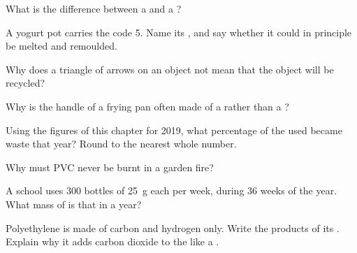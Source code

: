 \begin{exercise}[$\star$]\label{exo:g8:plastics:4}
What is the difference between a  and a ?
\end{exercise}

\begin{exercise}[$\star\star$]\label{exo:g8:plastics:5}
A yogurt pot carries the code 5. Name its , and say whether it
could in principle be melted and remoulded.
\end{exercise}

\begin{exercise}[$\star\star$]\label{exo:g8:plastics:6}
Why does a triangle of arrows on an object not mean that the object will
be recycled?
\end{exercise}

\begin{exercise}[$\star\star$]\label{exo:g8:plastics:7}
Why is the handle of a frying pan often made of a  rather than a
?
\end{exercise}

\begin{exercise}[$\star\star$]\label{exo:g8:plastics:8}
Using the figures of this chapter for 2019, what percentage of the
 used became waste that year? Round to the nearest whole number.
\end{exercise}

\begin{exercise}[$\star\star$]\label{exo:g8:plastics:9}
Why must PVC never be burnt in a garden fire?
\end{exercise}

\begin{exercise}[$\star\star$]\label{exo:g8:plastics:10}
A school uses 300 bottles of \qty{25}{g} each per week, during 36 weeks
of the year. What mass of  is that in a year?
\end{exercise}

\begin{exercise}[$\star\star\star$]\label{exo:g8:plastics:11}
Polyethylene is made of carbon and hydrogen only. Write the products of
its . Explain why  it adds carbon dioxide to
the  like a .
\end{exercise}

